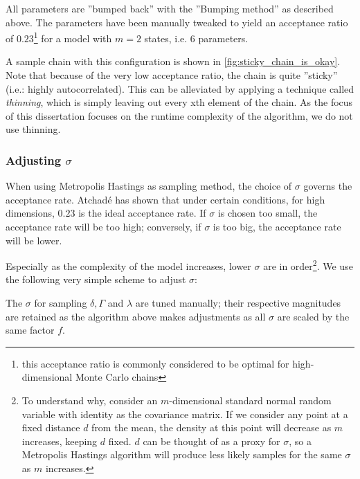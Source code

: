 All parameters are ''bumped back'' with the ''Bumping method'' as described above. The parameters have been manually tweaked to yield an acceptance ratio of $0.23$\footnote{this acceptance ratio is commonly considered to be optimal for high-dimensional Monte Carlo chains} for a model with $m=2$ states, i.e. $6$ parameters. 

A sample chain with this configuration is shown in \ref{fig:sticky_chain_is_okay}. Note that because of the very low acceptance ratio, the chain is quite ''sticky'' (i.e.: highly autocorrelated). This can be alleviated by applying a technique called \textit{thinning}, which is simply leaving out every xth element of the chain. As the focus of this dissertation focuses on the runtime complexity of the algorithm, we do not use thinning. 



\subsubsection{Adjusting $\sigma$}
When using Metropolis Hastings as sampling method, the choice of $\sigma$ governs the acceptance rate. Atchadé\cite{atchade} has shown that under certain conditions, for high dimensions, $0.23$ is the ideal acceptance rate. If $\sigma$ is chosen too small, the acceptance rate will be too high; conversely, if $\sigma$ is too big, the acceptance rate will be lower. 

Especially as the complexity of the model increases, lower $\sigma$ are in order\footnote{To understand why, consider an $m$-dimensional standard normal random variable with identity as the covariance matrix. If we consider any point at a fixed distance $d$ from the mean, the density at this point will decrease as $m$ increases, keeping $d$ fixed. $d$ can be thought of as a proxy for $\sigma$, so a Metropolis Hastings algorithm will produce less likely samples for the same $\sigma$ as $m$ increases. }. We use the following very simple scheme to adjust $\sigma$:

The $\sigma$ for sampling $\delta, \Gamma  $ and $\lambda$ are tuned manually; their respective magnitudes are retained as the algorithm above makes adjustments as all $\sigma$ are scaled by the same factor $f$. 
 


